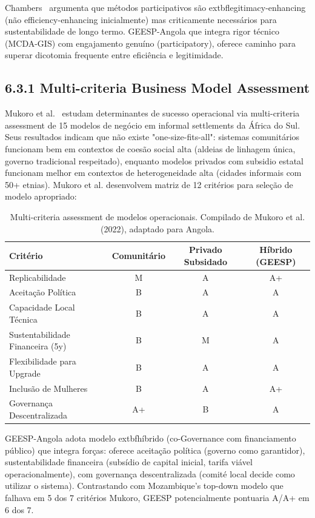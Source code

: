 \documentclass[12pt, a4paper]{article}
\begin{document}
Chambers~\citep{Chambers2019} argumenta que métodos participativos são 	extbf{legitimacy-enhancing} (não efficiency-enhancing inicialmente) mas criticamente necessários para sustentabilidade de longo termo. GEESP-Angola que integra rigor técnico (MCDA-GIS) com engajamento genuíno (participatory), oferece caminho para superar dicotomia frequente entre eficiência e legitimidade.

\subsection*{6.3.1 Multi-criteria Business Model Assessment}

Mukoro et al.~\citep{Mukoro2022} estudam determinantes de sucesso operacional via multi-criteria assessment de 15 modelos de negócio em informal settlements da África do Sul. Seus resultados indicam que não existe "one-size-fits-all": sistemas comunitários funcionam bem em contextos de coesão social alta (aldeias de linhagem única, governo tradicional respeitado), enquanto modelos privados com subsidio estatal funcionam melhor em contextos de heterogeneidade alta (cidades informais com 50+ etnias). Mukoro et al. desenvolvem matriz de 12 critérios para seleção de modelo apropriado:

\begin{table}[h]
\centering
\footnotesize
\begin{tabular}{|l|c|c|c|}
\hline
\textbf{Critério} & \textbf{Comunitário} & \textbf{Privado Subsidado} & \textbf{Híbrido (GEESP)} \\
\hline
Replicabilidade & M & A & A+ \\
Aceitação Política & B & A & A \\
Capacidade Local Técnica & B & A & A \\
Sustentabilidade Financeira (5y) & B & M & A \\
Flexibilidade para Upgrade & B & A & A \\
Inclusão de Mulheres & B & A & A+ \\
Governança Descentralizada & A+ & B & A \\
\hline
\end{tabular}
\caption{Multi-criteria assessment de modelos operacionais. Compilado de Mukoro et al. (2022), adaptado para Angola.}
\label{tab:business_models}
\end{table}

GEESP-Angola adota modelo 	extbf{híbrido (co-Governance com financiamento público)} que integra forças: oferece aceitação política (governo como garantidor), sustentabilidade financeira (subsídio de capital inicial, tarifa viável operacionalmente), com governança descentralizada (comité local decide como utilizar o sistema). Contrastando com Mozambique's top-down modelo que falhava em 5 dos 7 critérios Mukoro, GEESP potencialmente pontuaria A/A+ em 6 dos 7.
\end{document}

